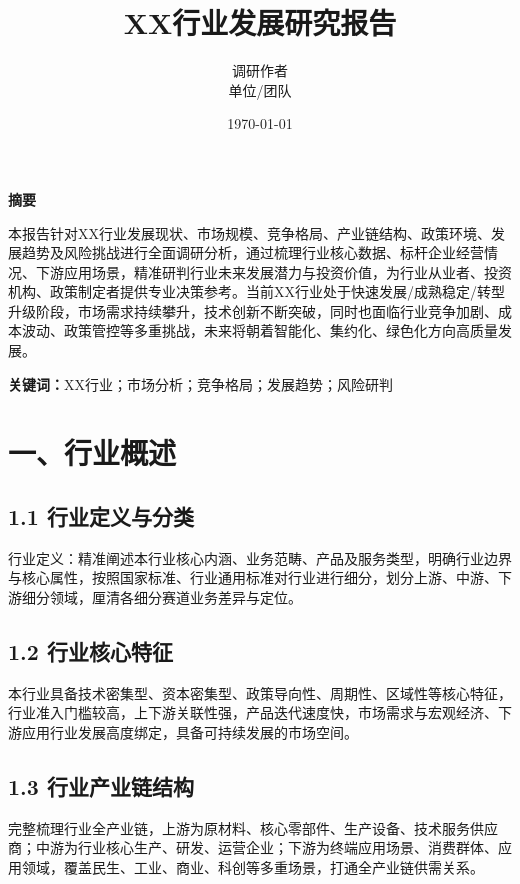 \documentclass[12pt,a4paper,UTF8]{ctexart}
\title{\textbf{XX行业发展研究报告}}
\author{调研作者\\单位/团队}
\date{\today}
\begin{document}
\maketitle
\thispagestyle{plain}

\newpage
\tableofcontents
\newpage

\begin{center}
    \textbf{摘\quad 要}
\end{center}
\par 本报告针对XX行业发展现状、市场规模、竞争格局、产业链结构、政策环境、发展趋势及风险挑战进行全面调研分析，通过梳理行业核心数据、标杆企业经营情况、下游应用场景，精准研判行业未来发展潜力与投资价值，为行业从业者、投资机构、政策制定者提供专业决策参考。当前XX行业处于快速发展/成熟稳定/转型升级阶段，市场需求持续攀升，技术创新不断突破，同时也面临行业竞争加剧、成本波动、政策管控等多重挑战，未来将朝着智能化、集约化、绿色化方向高质量发展。
\par \textbf{关键词：}XX行业；市场分析；竞争格局；发展趋势；风险研判

\newpage

\section{一、行业概述}
\subsection{1.1 行业定义与分类}
行业定义：精准阐述本行业核心内涵、业务范畴、产品及服务类型，明确行业边界与核心属性，按照国家标准、行业通用标准对行业进行细分，划分上游、中游、下游细分领域，厘清各细分赛道业务差异与定位。

\subsection{1.2 行业核心特征}
本行业具备技术密集型、资本密集型、政策导向性、周期性、区域性等核心特征，行业准入门槛较高，上下游关联性强，产品迭代速度快，市场需求与宏观经济、下游应用行业发展高度绑定，具备可持续发展的市场空间。

\subsection{1.3 行业产业链结构}
完整梳理行业全产业链，上游为原材料、核心零部件、生产设备、技术服务供应商；中游为行业核心生产、研发、运营企业；下游为终端应用场景、消费群体、应用领域，覆盖民生、工业、商业、科创等多重场景，打通全产业链供需关系。
\end{document}
